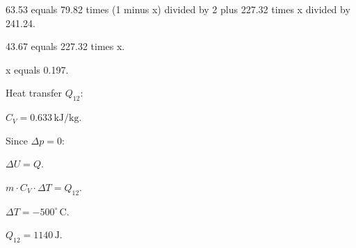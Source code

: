 63.53 equals 79.82 times (1 minus x) divided by 2 plus 227.32 times x divided by 241.24.  

43.67 equals 227.32 times x.  

x equals 0.197.

Heat transfer \( Q_{12} \):  

\( C_V = 0.633 \, \text{kJ/kg} \).  

Since \( \Delta p = 0 \):  

\( \Delta U = Q \).  

\( m \cdot C_V \cdot \Delta T = Q_{12} \).  

\( \Delta T = -500^\circ \, \text{C} \).  

\( Q_{12} = 1140 \, \text{J} \).